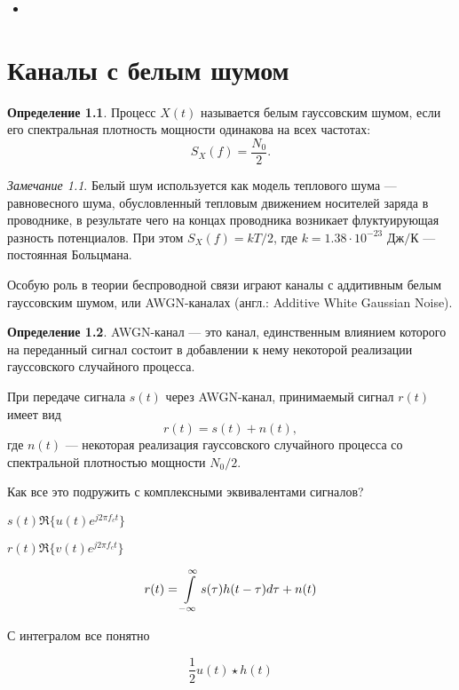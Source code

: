 \documentclass{book}
\numberwithin{theorem}{chapter}
\numberwithin{statement}{chapter}
\numberwithin{lemma}{chapter}
\theoremstyle{definition}
\numberwithin{task}{chapter}
\theoremstyle{remark}
\numberwithin{example}{chapter}
\theoremstyle{definition}
\newtheorem{definition}{Определение}
\numberwithin{definition}{chapter}
\theoremstyle{remark}
\newtheorem{note}{Замечание}
\theoremstyle{remark}
\numberwithin{lyrics}{section}
\begin{document}
\begin{itemize}
	\item 
\end{itemize}

\chapter{Каналы с белым шумом}

\begin{definition}
	Процесс $X(t)$ называется белым гауссовским шумом, если его спектральная плотность мощности одинакова на всех частотах:
	$$
	S_X(f) = \frac{N_0}{2}.
	$$
\end{definition}

\begin{note}
	Белый шум используется как модель теплового шума --- равновесного шума, обусловленный тепловым движением носителей заряда в проводнике, в результате чего на концах проводника возникает флуктуирующая разность потенциалов. При этом $S_X(f) = kT/2$, где $k = 1.38 \cdot 10^{-23} \text{ Дж/К}$ --- постоянная Больцмана.
\end{note}

Особую роль в теории беспроводной связи играют каналы с аддитивным белым гауссовским шумом, или AWGN-каналах (англ.: Additive White Gaussian Noise).
\begin{definition}
	AWGN-канал --- это канал, единственным влиянием которого на переданный сигнал состоит в добавлении к нему некоторой реализации гауссовского случайного процесса.
\end{definition}

При передаче сигнала $s(t)$ через AWGN-канал, принимаемый сигнал $r(t)$ имеет вид
\begin{equation*}
r(t) = s(t) + n(t),
\end{equation*}
где $n(t)$ --- некоторая реализация гауссовского случайного процесса со спектральной плотностью мощности $N_0 / 2$.

Как все это подружить с комплексными эквивалентами сигналов?

$s(t) \Re\{u(t)e^{j2\pi f_ct}\}$

$r(t) \Re\{v(t)e^{j2\pi f_c t}\}$

$$r(t) = \int\limits_{-\infty}^{\infty} s(\tau) h(t - \tau) d\tau + n(t)$$

С интегралом все понятно

$$\frac{1}{2} u(t) \star h(t)$$
\end{document}

